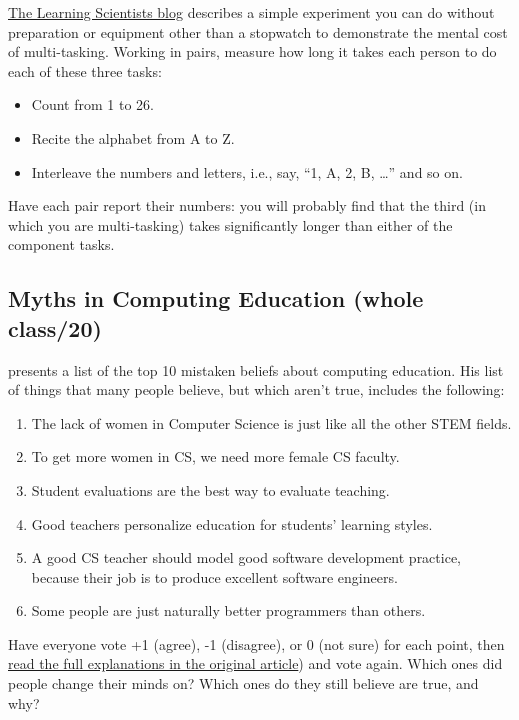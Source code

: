 \href{http://www.learningscientists.org/blog/2017/7/28-1}{The Learning Scientists blog}
describes a simple experiment you can do without preparation or
equipment other than a stopwatch to demonstrate the mental cost of
multi-tasking. Working in pairs, measure how long it takes each person
to do each of these three tasks:

\begin{itemize}
\item
  Count from 1 to 26.
\item
  Recite the alphabet from A to Z.
\item
  Interleave the numbers and letters, i.e., say, ``1, A, 2, B,
  {\ldots}'' and so on.
\end{itemize}

Have each pair report their numbers: you will probably find that the
third (in which you are multi-tasking) takes significantly longer than
either of the component tasks.

\subsection*{Myths in Computing Education (whole class/20)}

\cite{Guzd2015b} presents a list of the top 10 mistaken beliefs
about computing education. His list of things that many people
believe, but which aren't true, includes the following:

\begin{enumerate}
\item
  The lack of women in Computer Science is just like all the other
  STEM fields.
\item
  To get more women in CS, we need more female CS faculty.
\item
  Student evaluations are the best way to evaluate teaching.
\item
  Good teachers personalize education for students' learning styles.
\item
  A good CS teacher should model good software development practice,
  because their job is to produce excellent software engineers.
\item
  Some people are just naturally better programmers than others.
\end{enumerate}

Have everyone vote +1 (agree), -1 (disagree), or 0 (not sure) for each
point, then \href{https://cacm.acm.org/blogs/blog-cacm/189498-top-10-myths-about-teaching-computer-science/fulltext}{read the full explanations in the original
article}) and vote again. Which ones did people change
their minds on? Which ones do they still believe are true, and why?

